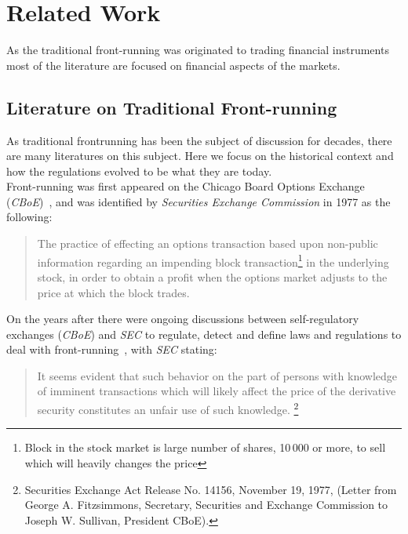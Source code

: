 \section{Related Work}
As the traditional front-running was originated to trading financial instruments most of the literature are focused on financial aspects of the markets. %


\subsection{Literature on Traditional Front-running}

As traditional frontrunning has been the subject of discussion for decades, there are many literatures on this subject. Here we focus on the historical context and how the regulations evolved to be what they are today.\\
Front-running was first appeared on the Chicago Board Options Exchange (\textit{CBoE})~\cite{markham1988front}, and was identified by \textit{Securities Exchange Commission} in 1977 as the following:
\begin{quote}
The practice of effecting an options transaction based upon non-public information regarding an impending block transaction\footnote{Block in the stock market is large number of shares, 10\,000 or more, to sell which will heavily changes the price} in the underlying stock, in order to obtain a profit when the options market adjusts to the price at which the block trades. ~\cite{sec1978optionsmarket}
\end{quote} 


On the years after there were ongoing discussions between self-regulatory exchanges (\eg \textit{CBoE}) and  \textit{SEC} to regulate, detect and define laws and regulations to deal with front-running~\cite{markham1988front}, with \textit{SEC} stating: 
\begin{quote}
It seems evident that such behavior on the part of persons with knowledge of imminent transactions which will likely affect the price of the derivative security constitutes an unfair use of such knowledge. \footnote{Securities Exchange Act Release No. 14156, November 19, 1977, (Letter from George A. Fitzsimmons, Secretary, Securities and Exchange Commission to Joseph W. Sullivan, President  CBoE).}
\end{quote} 

